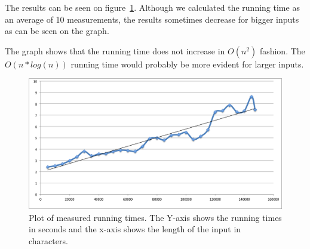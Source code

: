\documentclass[a4paper,10pt]{article}
\begin{document}
The results can be seen on figure~\ref{fig:evaluation}.
Although we calculated the running time as an average of 10 measurements,
the results sometimes decrease for bigger inputs as can be seen on the graph.

The graph shows that the running time does not increase in $O(n^2)$ fashion.
The $O(n*log(n))$ running time would probably be more evident for larger
inputs.

\begin{figure}
\centering
\includegraphics[scale=0.6]{images/tandem-evaluation_graph.png}
\caption{Plot of measured running times. The Y-axis shows the running times
in seconds and the x-axis shows the length of the input in characters.}
\label{fig:evaluation}
\end{figure}
\end{document}
